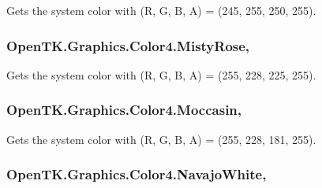 Gets the system color with (R, G, B, A) = (245, 255, 250, 255). 

\hypertarget{struct_open_t_k_1_1_graphics_1_1_color4_a0095673ded7895355a8d415f541d152a}{
\subsubsection[{Misty\-Rose}]{ Open\-T\-K.\-Graphics.\-Color4.\-Misty\-Rose\hspace{0.3cm}{\ttfamily [static]}, {\ttfamily [get]}}}\label{struct_open_t_k_1_1_graphics_1_1_color4_a0095673ded7895355a8d415f541d152a}


Gets the system color with (R, G, B, A) = (255, 228, 225, 255). 

\hypertarget{struct_open_t_k_1_1_graphics_1_1_color4_a93f2d6855f5eaa3c374f5e8ba58bd60d}{
\subsubsection[{Moccasin}]{ Open\-T\-K.\-Graphics.\-Color4.\-Moccasin\hspace{0.3cm}{\ttfamily [static]}, {\ttfamily [get]}}}\label{struct_open_t_k_1_1_graphics_1_1_color4_a93f2d6855f5eaa3c374f5e8ba58bd60d}


Gets the system color with (R, G, B, A) = (255, 228, 181, 255). 

\hypertarget{struct_open_t_k_1_1_graphics_1_1_color4_a6ef8118bc99d036220f915f9de87deca}{
\subsubsection[{Navajo\-White}]{ Open\-T\-K.\-Graphics.\-Color4.\-Navajo\-White\hspace{0.3cm}{\ttfamily [static]}, {\ttfamily [get]}}}\label{struct_open_t_k_1_1_graphics_1_1_color4_a6ef8118bc99d036220f915f9de87deca}


